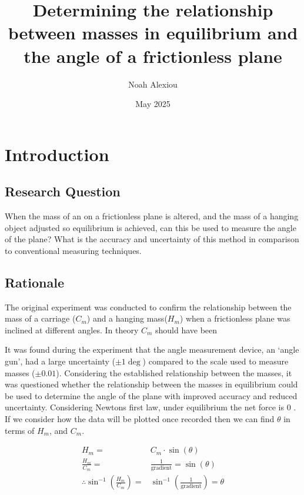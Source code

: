\documentclass[11pt,a4paper]{article}
\begin{document}
\begin{titlepage}


\title{Determining the relationship between masses in equilibrium and the angle of a frictionless plane}

\author{Noah Alexiou}


\date{May 2025}

\maketitle
\centering

\end{titlepage}
\tableofcontents
\newpage

\section{Introduction}

\subsection{Research Question}
When the mass of an  on a frictionless plane is altered, and the mass of a hanging object adjusted so  equilibrium is achieved, can this be used to measure the angle of the plane? What is the accuracy and uncertainty of this method in comparison to conventional measuring techniques. 

\subsection{Rationale}

The original experiment was conducted to confirm the relationship between the mass of a carriage ($C_m$) and a hanging mass($H_m$) when a frictionless plane was inclined at different angles. In theory $C_m$ should have been 

It was found during the experiment that the angle measurement device, an `angle gun', had a large uncertainty ($\pm1\deg$) compared to the scale used to measure masses ($\pm0.01$). Considering the established relationship between the masses, it was questioned whether the relationship between the masses in equilibrium could be used to determine the angle of the plane with improved accuracy and reduced uncertainty. 
\newline
\newline
Considering Newtons first law, under equilibrium the net force is 0 \cite{encyclopediabritannica_2023_newtons}. If we consider how the data will be plotted once recorded then we can find $\theta$ in terms of $H_m$, and $C_m$. 
\begin{center}
	\begin{align*}
	H_m= &C_m\cdot{\sin(\theta)} \\
	\frac{H_m}{C_m}=&\frac{1}{\mathrm{gradient}}=\sin(\theta)\\
	\therefore \sin^{-1}\left(\frac{H_m}{{C_m}}\right)=&\sin^{-1}\left(\frac{1}{\textrm{gradient}}\right)=\theta
	\end{align*}
\end{center}
\end{document}
